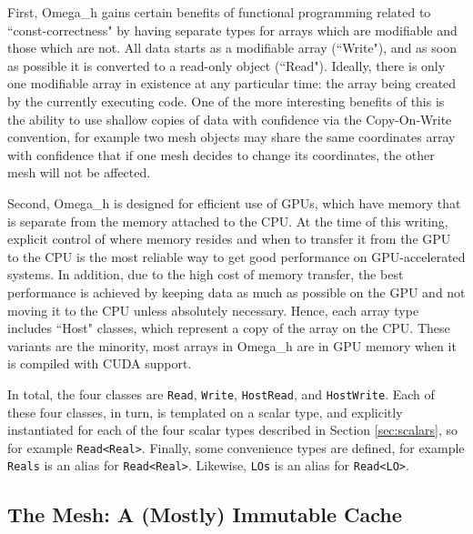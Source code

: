 \documentclass{article}
\begin{document}
First, Omega\_h gains certain benefits of functional programming
related to ``const-correctness" by having separate types
for arrays which are modifiable and those which are not.
All data starts as a modifiable array (``Write"), and as soon as possible
it is converted to a read-only object (``Read").
Ideally, there is only one modifiable array in existence at any
particular time: the array being created by the currently
executing code.
One of the more interesting benefits of this is the ability
to use shallow copies of data with confidence via the
Copy-On-Write convention, for example two mesh objects
may share the same coordinates array with confidence
that if one mesh decides to change its coordinates,
the other mesh will not be affected.

Second, Omega\_h is designed for efficient use of
GPUs, which have memory that is separate from
the memory attached to the CPU.
At the time of this writing, explicit control of where
memory resides and when to transfer it from the GPU
to the CPU is the most reliable way to get good
performance on GPU-accelerated systems.
In addition, due to the high cost of memory transfer,
the best performance is achieved by keeping data as
much as possible on the GPU and not moving it to the
CPU unless absolutely necessary.
Hence, each array type includes ``Host" classes,
which represent a copy of the array on the CPU.
These variants are the minority, most arrays in Omega\_h
are in GPU memory when it is compiled with CUDA support.

In total, the four classes are \texttt{Read}, \texttt{Write},
\texttt{HostRead}, and \texttt{HostWrite}.
Each of these four classes, in turn, is templated on
a scalar type, and explicitly instantiated for
each of the four scalar types described in Section
\ref{sec:scalars}, so for example \texttt{Read<Real>}.
Finally, some convenience types are defined, for example
\texttt{Reals} is an alias for \texttt{Read<Real>}.
Likewise, \texttt{LOs} is an alias for \texttt{Read<LO>}.

\subsection{The Mesh: A (Mostly) Immutable Cache}
\end{document}
